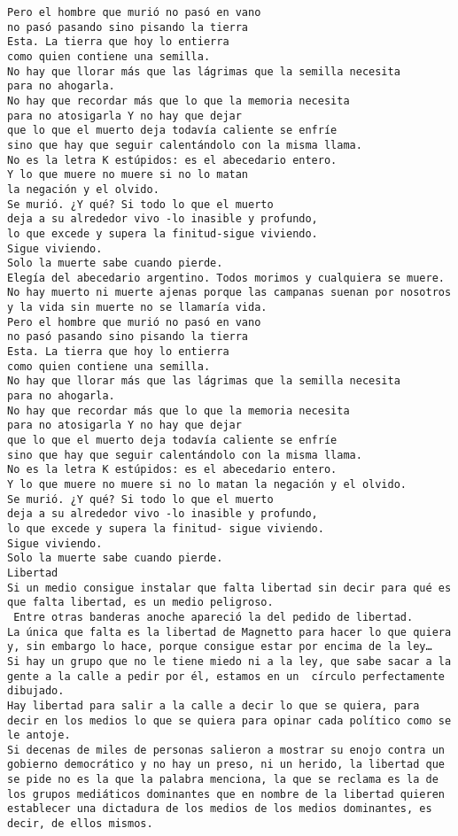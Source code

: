 \documentclass[11pt]{article}
\begin{document}
\begin{Verbatim}[commandchars=\\\{\}]
Pero el hombre que murió no pasó en vano
no pasó pasando sino pisando la tierra
Esta. La tierra que hoy lo entierra
como quien contiene una semilla.
No hay que llorar más que las lágrimas que la semilla necesita
para no ahogarla. 
No hay que recordar más que lo que la memoria necesita
para no atosigarla Y no hay que dejar
que lo que el muerto deja todavía caliente se enfríe
sino que hay que seguir calentándolo con la misma llama.
No es la letra K estúpidos: es el abecedario entero.
Y lo que muere no muere si no lo matan
la negación y el olvido.
Se murió. ¿Y qué? Si todo lo que el muerto
deja a su alrededor vivo -lo inasible y profundo,
lo que excede y supera la finitud-sigue viviendo.
Sigue viviendo.
Solo la muerte sabe cuando pierde.
﻿Elegía del abecedario argentino. Todos morimos y cualquiera se muere.
No hay muerto ni muerte ajenas porque las campanas suenan por nosotros
y la vida sin muerte no se llamaría vida.
Pero el hombre que murió no pasó en vano
no pasó pasando sino pisando la tierra
Esta. La tierra que hoy lo entierra
como quien contiene una semilla.
No hay que llorar más que las lágrimas que la semilla necesita
para no ahogarla.
No hay que recordar más que lo que la memoria necesita
para no atosigarla Y no hay que dejar
que lo que el muerto deja todavía caliente se enfríe
sino que hay que seguir calentándolo con la misma llama.
No es la letra K estúpidos: es el abecedario entero.
Y lo que muere no muere si no lo matan la negación y el olvido.
Se murió. ¿Y qué? Si todo lo que el muerto
deja a su alrededor vivo -lo inasible y profundo,
lo que excede y supera la finitud- sigue viviendo.
Sigue viviendo.
Solo la muerte sabe cuando pierde.
﻿Libertad  
Si un medio consigue instalar que falta libertad sin decir para qué es que falta libertad, es un medio peligroso.
 Entre otras banderas anoche apareció la del pedido de libertad.
La única que falta es la libertad de Magnetto para hacer lo que quiera y, sin embargo lo hace, porque consigue estar por encima de la ley…
Si hay un grupo que no le tiene miedo ni a la ley, que sabe sacar a la gente a la calle a pedir por él, estamos en un  círculo perfectamente dibujado.
Hay libertad para salir a la calle a decir lo que se quiera, para decir en los medios lo que se quiera para opinar cada político como se le antoje.
Si decenas de miles de personas salieron a mostrar su enojo contra un gobierno democrático y no hay un preso, ni un herido, la libertad que se pide no es la que la palabra menciona, la que se reclama es la de los grupos mediáticos dominantes que en nombre de la libertad quieren establecer una dictadura de los medios de los medios dominantes, es decir, de ellos mismos.

\end{Verbatim}
\end{document}
